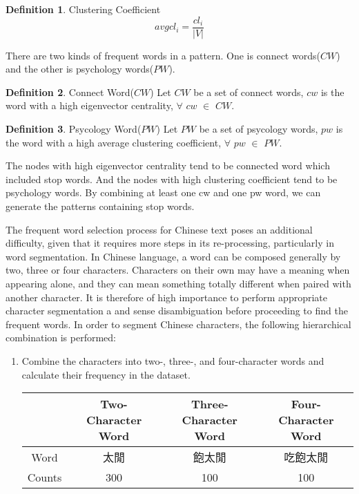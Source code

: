 \documentclass[12pt,a4paper]{report}
\theoremstyle{definition}
\newtheorem{definition}{Definition}[chapter]
\begin{document}
\begin{CJK}{UTF8}{bsmi}
\begin{definition}{Clustering Coefficient}
\begin{equation}
        avgcl_i = \frac{cl_i}{\left| V \right|}
    \end{equation}
    \end{definition}
    There are two kinds of frequent words in a pattern. One is connect words(\(CW\)) and the other is psychology words(\(PW\)).
    \theoremstyle{definition}
    \begin{definition}{Connect Word(\(CW\))}
    \newline
    Let \(CW\) be a set of connect words, \(cw\) is the word with a high eigenvector centrality, $\forall$ \(cw\) $\in$ \(CW\). 
    \end{definition}
    \begin{definition}{Psycology Word(\(PW\))}
    \newline
    Let \(PW\) be a set of psycology words, \(pw\) is the word with a high average clustering coefficient, $\forall$ \(pw\) $\in$ \(PW\).
    \end{definition}
    \par The nodes with high eigenvector centrality tend to be connected word which included stop words. And the nodes with high clustering coefficient tend to be psychology words. By combining at least one cw and one pw word, we can generate the patterns containing stop words.
    \par The frequent word selection process for Chinese text poses an additional difficulty, given that it requires more steps in its re-processing, particularly in word segmentation. In Chinese language, a word can be composed generally by two, three or four characters. Characters on their own may have a meaning when appearing alone, and they can mean something totally different when paired with another character. It is therefore of high importance to perform appropriate character segmentation a and sense disambiguation before proceeding to find the frequent words. In order to segment Chinese characters, the following hierarchical combination is performed:
    \begin{CJK}{UTF8}{bsmi}
    \begin{enumerate}
        \item Combine the characters into two-, three-, and four-character words and calculate their frequency in the dataset.
        \newline
   
        \begin{table}[H]
        \centering
        \begin{tabular}{|c|c|c|c|}
            \hline
             & Two-Character Word  & Three-Character Word  & Four-Character Word  \\
            \hline
            Word & 太閒 & 飽太閒 & 吃飽太閒\\
            \hline
            Counts & 300 & 100 & 100 \\
            \hline
        \end{tabular}
        \end{table}
    

\end{enumerate}
\end{CJK}
\end{CJK}
\end{document}
